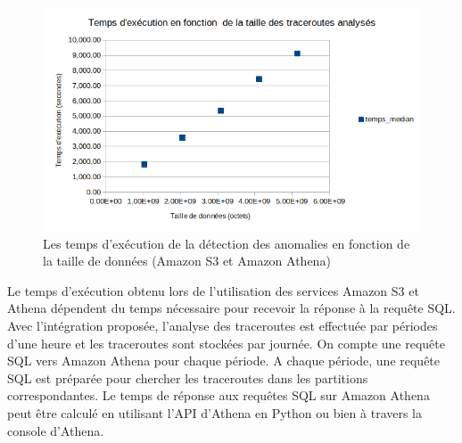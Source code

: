
\begin{figure}[h]
	\centering
	\captionsetup{justification=centering}
	\includegraphics[width=\linewidth]{illustrations/temps-exection-amazonathena}
	\caption{Les temps d'exécution de la détection des anomalies en fonction de la taille de données (Amazon S3 et Amazon Athena)}
	\label{fig:temps-avec-aws}
\end{figure}


Le temps d'exécution obtenu lors de l'utilisation des services Amazon S3 et Athena dépendent du temps nécessaire pour recevoir la réponse à la requête SQL. Avec l'intégration proposée, l'analyse des traceroutes est effectuée par périodes d'une heure et les traceroutes sont stockées par journée. On compte une requête SQL vers Amazon Athena pour chaque période. 
A chaque période, une requête SQL est préparée pour chercher les traceroutes  dans les partitions  correspondantes. Le temps de réponse aux requêtes SQL sur Amazon Athena peut être calculé en utilisant l'API d'Athena en Python ou bien à travers la console d'Athena.  


